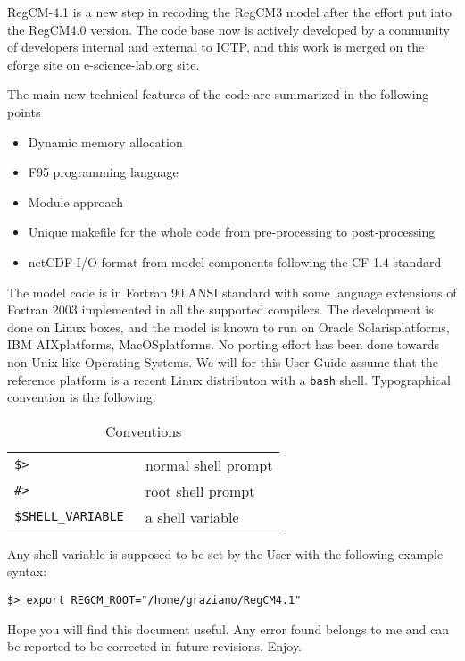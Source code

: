 %
%

RegCM-4.1 is a new step in recoding the RegCM3 model after the effort put into
the RegCM4.0 version. The code base now is actively developed by a community
of developers internal and external to ICTP, and this work is merged on the
eforge site on e-science-lab.org site.

The main new technical features of the code are summarized in the following
points

\begin{itemize}
\item Dynamic memory allocation
\item F95 programming language
\item Module approach
\item Unique makefile for the whole code from pre-processing to post-processing
\item netCDF I/O format from model components following the CF-1.4 standard
\end{itemize}

The model code is in Fortran 90 ANSI standard with some language extensions of
Fortran 2003 implemented in all the supported compilers.
The development is done on Linux boxes, and the model is known to run
on Oracle Solaris\texttrademark platforms, IBM AIX\texttrademark platforms,
MacOS\texttrademark platforms.
No porting effort has been done towards non Unix-like Operating Systems.
We will for this User Guide assume that the reference platform is a recent
Linux distributon with a \verb=bash= shell.
Typographical convention is the following:

\begin{table}[ht]
\caption{Conventions}
\vspace{0.05 in}
\centering
\begin{tabular}{l|l}
\hline
\verb=$> = & normal shell prompt \\
\verb=#> = & root shell prompt \\
\verb=$SHELL_VARIABLE = & a shell variable \\
\hline
\end{tabular}
\label{conventions}
\end{table}

Any shell variable is supposed to be set by the User with the following example
syntax:

\begin{Verbatim}
$> export REGCM_ROOT="/home/graziano/RegCM4.1"
\end{Verbatim}

Hope you will find this document useful. Any error found belongs to me and can
be reported to be corrected in future revisions. Enjoy.
